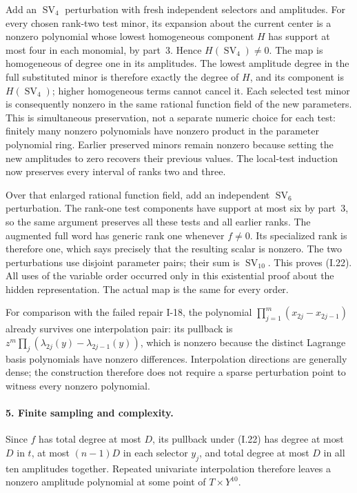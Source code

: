 \documentclass[11pt,a4paper]{article}
\theoremstyle{definition}\newtheorem{definition}{Definition}
\begin{document}
Add an $\operatorname{SV}_4$ perturbation with fresh independent
selectors and amplitudes.  For every chosen rank-two test minor,
its expansion about the current center is a nonzero polynomial
whose lowest homogeneous component $H$ has support at most four
in each monomial, by part~3.  Hence $H(\operatorname{SV}_4)\ne0$.
The map is homogeneous of degree one in its amplitudes.  The
lowest amplitude degree in the full substituted minor is
therefore exactly the degree of $H$, and its component is
$H(\operatorname{SV}_4)$; higher homogeneous terms cannot cancel
it.  Each selected test minor is consequently nonzero in the
same rational function field of the new parameters.  This is
simultaneous preservation, not a separate numeric choice for
each test: finitely many nonzero polynomials have nonzero product
in the parameter polynomial ring.  Earlier preserved minors
remain nonzero because setting the new amplitudes to zero
recovers their previous values.  The local-test induction now
preserves every interval of ranks two and three.

Over that enlarged rational function field, add an independent
$\operatorname{SV}_6$ perturbation.  The rank-one test components
have support at most six by part~3, so the same argument preserves
all these tests and all earlier ranks.  The augmented full word
has generic rank one whenever $f\ne0$.  Its specialized rank is
therefore one, which says precisely that the resulting scalar is
nonzero.  The two perturbations use disjoint parameter pairs;
their sum is $\operatorname{SV}_{10}$.  This proves (I.22).
All uses of the variable order occurred only in this existential
proof about the hidden representation.  The actual map is the
same for every order.

For comparison with the failed repair I-18, the polynomial
$\prod_{j=1}^m(x_{2j}-x_{2j-1})$ already survives one interpolation
pair: its pullback is
$z^m\prod_j(\lambda_{2j}(y)-\lambda_{2j-1}(y))$, which is nonzero
because the distinct Lagrange basis polynomials have nonzero
differences.  Interpolation directions are generally dense;
the construction therefore does not require a sparse perturbation
point to witness every nonzero polynomial.

\paragraph{5. Finite sampling and complexity.}
Since $f$ has total degree at most $D$, its pullback under (I.22)
has degree at most $D$ in $t$, at most $(n-1)D$ in each selector
$y_j$, and total degree at most $D$ in all ten amplitudes together.
Repeated univariate interpolation therefore leaves a nonzero
amplitude polynomial at some point of $T\times Y^{10}$.
\end{document}
